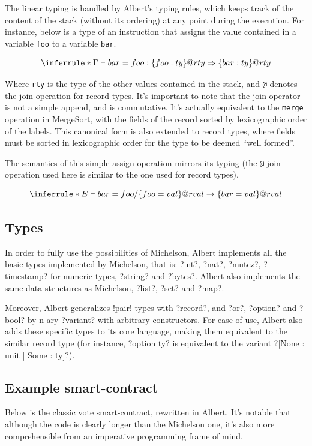 \documentclass{report}
\begin{document}
The linear typing is handled by Albert's typing rules, which keeps track of the content of the stack (without its ordering) at any point during the execution. For instance, below is a type of an instruction that assigns the value contained in a variable \texttt{foo} to a variable \texttt{bar}.

$$
\inferrule*
    { }
    { \Gamma \vdash bar = foo : \{ foo : ty \} @ rty \Rightarrow \{ bar : ty \} @ rty }
$$

    Where \texttt{rty} is the type of the other values contained in the stack, and \texttt{@} denotes the join operation for record types. It's important to note that the join operator is not a simple append, and is commutative. It's actually equivalent to the \texttt{merge} operation in MergeSort, with the fields of the record sorted by lexicographic order of the labels. This canonical form is also extended to record types, where fields must be sorted in lexicographic order for the type to be deemed ``well formed''.

The semantics of this simple assign operation mirrors its typing (the \texttt{@} join operation used here is similar to the one used for record types).

$$
\inferrule*
    { }
    { E \vdash bar = foo / \{ foo = val \} @ rval \rightarrow \{ bar = val \} @ rval }
    $$

\subsection{Types}

In order to fully use the possibilities of Michelson, Albert implements all the basic types implemented by Michelson, that is: ?int?, ?nat?, ?mutez?, ?timestamp? for numeric types, ?string? and ?bytes?. Albert also implements the same data structures as Michelson, ?list?, ?set? and ?map?.

Moreover, Albert generalizes !pair! types with ?record?, and ?or?, ?option? and ?bool? by n-ary ?variant? with arbitrary constructors. For ease of use, Albert also adds these specific types to its core language, making them equivalent to the similar record type (for instance, ?option ty? is equivalent to the variant ?[None : unit | Some : ty]?).

\subsection{Example smart-contract}

Below is the classic vote smart-contract, rewritten in Albert. It's notable that although the code is clearly longer than the Michelson one, it's also more comprehensible from an imperative programming frame of mind.
\end{document}
